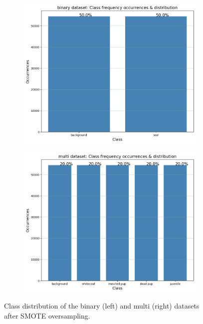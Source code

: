 \documentclass[letterpaper,12pt]{article}
\begin{document}
\begin{figure}[h]
\centering
\begin{subfigure}{.5\textwidth}
  \centering
  \includegraphics[width=\textwidth]{report/figures/binary_class_distribution_oversampled.png}
  \label{fig:binary_class_distribution_oversampled}
\end{subfigure}%
\begin{subfigure}{.5\textwidth}
  \centering
  \includegraphics[width=\textwidth]{report/figures/multi_class_distribution_oversampled.png}
  \label{fig:multi_class_distribution_oversampled}
\end{subfigure}
\caption{\label{fig:class_distribution_oversample}Class distribution of the binary (left) and multi (right) datasets after SMOTE oversampling.}
\end{figure}
\end{document}
